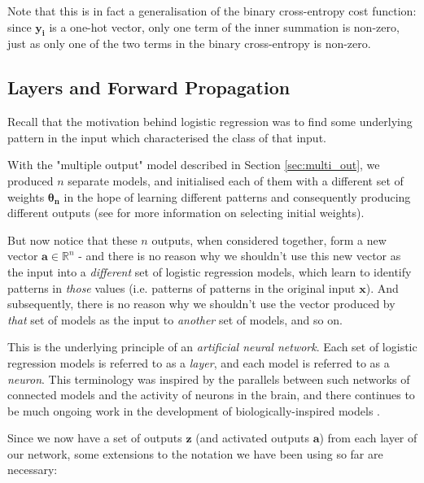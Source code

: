 \documentclass{article}[11pt]
\begin{document}
        Note that this is in fact a generalisation of the binary cross-entropy cost function: since $\mathbf{y_i}$ is a one-hot vector, only one term of the inner summation is non-zero, just as only one of the two terms in the binary cross-entropy is non-zero.
        
        
        
    
    \subsection{Layers and Forward Propagation}
        
        
        Recall that the motivation behind logistic regression was to find some underlying pattern in the input which characterised the class of that input.
        
        With the "multiple output" model described in Section \ref{sec:multi_out}, we produced $n$ separate models, and initialised each of them with a different set of weights $\boldsymbol{\theta_n}$ in the hope of learning different patterns and consequently producing different outputs (see \cite{lecun_backprop} for more information on selecting initial weights).
        
        But now notice that these $n$ outputs, when considered together, form a new vector $\mathbf{a} \in \mathbb{R}^n$ - and there is no reason why we shouldn't use this new vector as the input into a \textit{different} set of logistic regression models, which learn to identify patterns in \textit{those} values (i.e. patterns of patterns in the original input $\mathbf{x}$). And subsequently, there is no reason why we shouldn't use the vector produced by \textit{that} set of models as the input to \textit{another} set of models, and so on.
        
        This is the underlying principle of an \textit{artificial neural network}. Each set of logistic regression models is referred to as a \textit{layer}, and each model is referred to as a \textit{neuron}. This terminology was inspired by the parallels between such networks of connected models and the activity of neurons in the brain, and there continues to be much ongoing work in the development of biologically-inspired models \cite{bionets}.
        
        Since we now have a set of outputs $\mathbf{z}$ (and activated outputs $\mathbf{a}$) from each layer of our network, some extensions to the notation we have been using so far are necessary:
        
\end{document}
